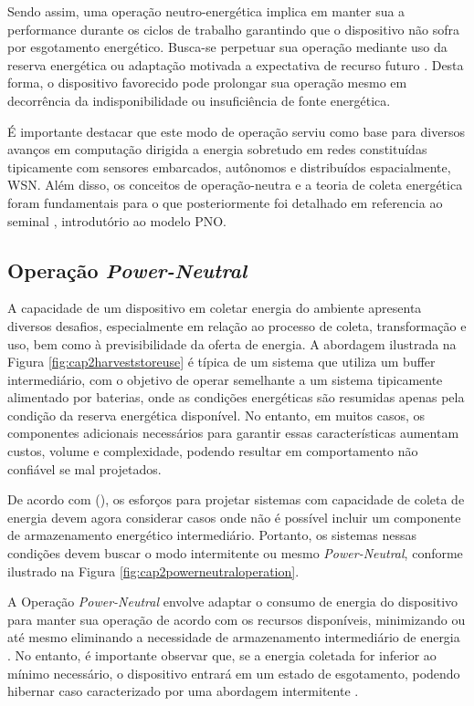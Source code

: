 Sendo assim, uma operação neutro-energética implica em manter sua a performance durante os ciclos de trabalho garantindo que o dispositivo não sofra por esgotamento energético. Busca-se perpetuar sua operação mediante uso da reserva energética ou adaptação motivada a expectativa de recurso futuro \cite{sudevalayam_energy_2011}. Desta forma, o dispositivo favorecido pode prolongar sua operação mesmo em decorrência da indisponibilidade ou insuficiência de fonte energética.

É importante destacar que este modo de operação serviu como base para diversos avanços em computação dirigida a energia sobretudo em redes constituídas tipicamente com sensores embarcados, autônomos e distribuídos espacialmente, \acf{WSN}. Além disso, os conceitos de operação-neutra e a teoria de coleta energética foram fundamentais para o que posteriormente foi detalhado em referencia ao seminal \cite{merrett_energy-driven_2017}, introdutório ao modelo \acf{PNO}.



\subsection{Operação \textit{Power-Neutral}}
A capacidade de um dispositivo em coletar energia do ambiente apresenta diversos desafios, especialmente em relação ao processo de coleta, transformação e uso, bem como à previsibilidade da oferta de energia. A abordagem ilustrada na Figura \ref{fig:cap2harveststoreuse} é típica de um sistema que utiliza um buffer intermediário, com o objetivo de operar semelhante a um sistema tipicamente alimentado por baterias, onde as condições energéticas são resumidas apenas pela condição da reserva energética disponível. No entanto, em muitos casos, os componentes adicionais necessários para garantir essas características aumentam custos, volume e complexidade, podendo resultar em comportamento não confiável se mal projetados.

De acordo com \citeauthor{merrett_energy-driven_2017}(\citeyear{merrett_energy-driven_2017}), os esforços para projetar sistemas com capacidade de coleta de energia devem agora considerar casos onde não é possível incluir um componente de armazenamento energético intermediário. Portanto, os sistemas nessas condições devem buscar o modo intermitente ou mesmo \textit{Power-Neutral}, conforme ilustrado na Figura \ref{fig:cap2powerneutraloperation}.

A Operação \textit{Power-Neutral} envolve adaptar o consumo de energia do dispositivo para manter sua operação de acordo com os recursos disponíveis, minimizando ou até mesmo eliminando a necessidade de armazenamento intermediário de energia \cite{sliper_energy-driven_2020}. No entanto, é importante observar que, se a energia coletada for inferior ao mínimo necessário, o dispositivo entrará em um estado de esgotamento, podendo hibernar caso caracterizado por uma abordagem intermitente \cite{merrett_energy-driven_2017}.



